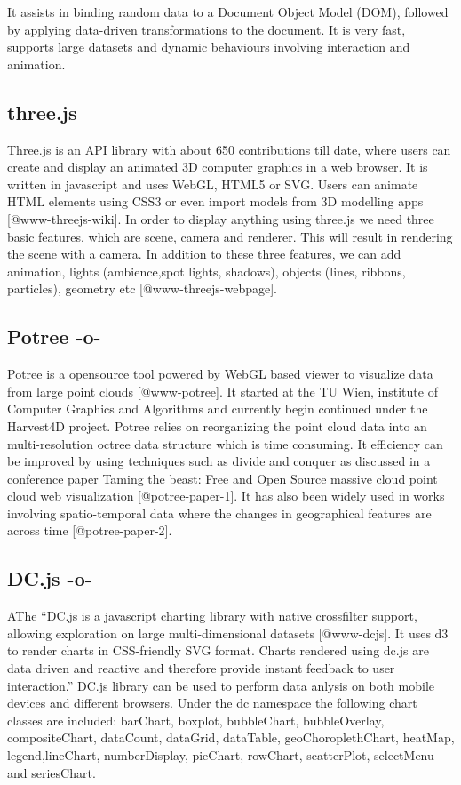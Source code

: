 It assists in binding random data to a Document Object Model (DOM),
followed by applying data-driven transformations to the document. It
is very fast, supports large datasets and dynamic behaviours involving
interaction and animation.

    
\subsection{three.js}

Three.js is an API library with about 650 contributions till date,
where users can create and display an animated 3D computer graphics in
a web browser. It is written in javascript and uses WebGL, HTML5 or
SVG. Users can animate HTML elements using CSS3 or even import models
from 3D modelling apps [@www-threejs-wiki]. In order to display
anything using three.js we need three basic features, which are scene,
camera and renderer. This will result in rendering the scene with a
camera. In addition to these three features, we can add animation,
lights (ambience,spot lights, shadows), objects (lines, ribbons,
particles), geometry etc [@www-threejs-webpage].
    
\subsection{Potree -o-}

Potree is a opensource tool powered by WebGL based viewer to visualize
data from large point clouds [@www-potree].  It started at the TU
Wien, institute of Computer Graphics and Algorithms and currently
begin continued under the Harvest4D project. Potree relies on
reorganizing the point cloud data into an multi-resolution octree data
structure which is time consuming. It efficiency can be improved by
using techniques such as divide and conquer as discussed in a
conference paper Taming the beast: Free and Open Source massive cloud
point cloud web visualization [@potree-paper-1]. It has also been
widely used in works involving spatio-temporal data where the changes
in geographical features are across time [@potree-paper-2].


    
\subsection{DC.js -o-}

AThe ``DC.js is a javascript charting library with
native crossfilter support, allowing exploration on large
multi-dimensional datasets [@www-dcjs]. It uses d3 to render
charts in CSS-friendly SVG format. Charts rendered using dc.js are
data driven and reactive and therefore provide instant feedback to
user interaction.'' DC.js library can be used to perform data anlysis
on both mobile devices and different browsers. Under the dc namespace
the following chart classes are included: barChart, boxplot,
bubbleChart, bubbleOverlay, compositeChart, dataCount, dataGrid,
dataTable, geoChoroplethChart, heatMap, legend,lineChart,
numberDisplay, pieChart, rowChart, scatterPlot, selectMenu and
seriesChart.


